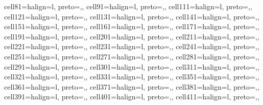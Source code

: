 \begin{table}
\begin{talltblr}
{cell{8}{1}={}{halign=l, preto={\hspace{1em}},},
cell{9}{1}={}{halign=l, preto={\hspace{1em}},},
cell{11}{1}={}{halign=l, preto={\hspace{1em}},},
cell{12}{1}={}{halign=l, preto={\hspace{1em}},},
cell{13}{1}={}{halign=l, preto={\hspace{1em}},},
cell{14}{1}={}{halign=l, preto={\hspace{1em}},},
cell{15}{1}={}{halign=l, preto={\hspace{1em}},},
cell{16}{1}={}{halign=l, preto={\hspace{1em}},},
cell{17}{1}={}{halign=l, preto={\hspace{1em}},},
cell{19}{1}={}{halign=l, preto={\hspace{1em}},},
cell{20}{1}={}{halign=l, preto={\hspace{1em}},},
cell{21}{1}={}{halign=l, preto={\hspace{1em}},},
cell{22}{1}={}{halign=l, preto={\hspace{1em}},},
cell{23}{1}={}{halign=l, preto={\hspace{1em}},},
cell{24}{1}={}{halign=l, preto={\hspace{1em}},},
cell{25}{1}={}{halign=l, preto={\hspace{1em}},},
cell{27}{1}={}{halign=l, preto={\hspace{1em}},},
cell{28}{1}={}{halign=l, preto={\hspace{1em}},},
cell{29}{1}={}{halign=l, preto={\hspace{1em}},},
cell{30}{1}={}{halign=l, preto={\hspace{1em}},},
cell{31}{1}={}{halign=l, preto={\hspace{1em}},},
cell{32}{1}={}{halign=l, preto={\hspace{1em}},},
cell{33}{1}={}{halign=l, preto={\hspace{1em}},},
cell{35}{1}={}{halign=l, preto={\hspace{1em}},},
cell{36}{1}={}{halign=l, preto={\hspace{1em}},},
cell{37}{1}={}{halign=l, preto={\hspace{1em}},},
cell{38}{1}={}{halign=l, preto={\hspace{1em}},},
cell{39}{1}={}{halign=l, preto={\hspace{1em}},},
cell{40}{1}={}{halign=l, preto={\hspace{1em}},},
cell{41}{1}={}{halign=l, preto={\hspace{1em}},},
}
\end{talltblr}
\end{table}
